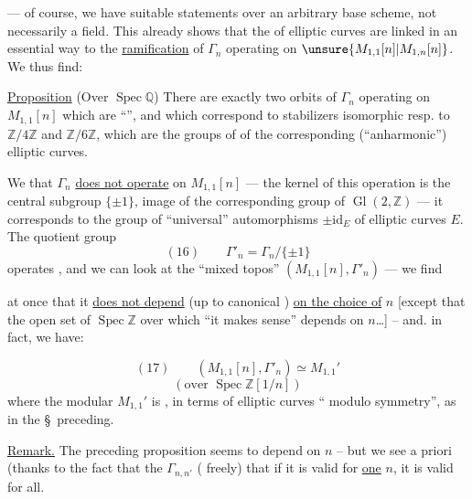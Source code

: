 
--- of course, we have suitable statements over an arbitrary base scheme, not necessarily a field. This already shows that the  of elliptic curves are linked in an essential way to the \uline{ramification} of $\Gamma_n$ operating on $\unsure{M_{1,1}[n]|M_{1,n}[n]}$. We thus find:

\uline{Proposition} (Over $\operatorname{Spec}\mathbb Q$) There are exactly two orbits of $\Gamma_n$ operating on $M_{1,1}[n]$ which are ``'', and which correspond to stabilizers isomorphic resp. to $\mathbb Z/4\mathbb Z$ and $\mathbb Z/6\mathbb Z$, which are the groups of  of the corresponding (``anharmonic'') elliptic curves.


We  that $\Gamma_n$ \uline{does not operate}  on $M_{1,1}[n]$ --- the kernel of this operation is the central subgroup $\{\pm1\}$, image of the corresponding group of $\operatorname{Gl}(2,\mathbb Z)$ --- it corresponds to the group of ``universal'' automorphisms $\pm\mathrm{id}_E$ of elliptic curves $E$. The quotient group
\[
(16)\qquad \Gamma'_n=\Gamma_n/\{\pm1\}
\]
 operates , and we can look at the ``mixed topos'' $(M_{1,1}[n],\Gamma'_n)$ --- we find

at once that it \uline{does not depend} (up to canonical ) \uline{on the choice of} $n$ [except that the open set of $\operatorname{Spec}\mathbb Z$ over which ``it makes sense'' depends on $n$\dots] -- and. in fact, we have:


\[
(17)\qquad (M_{1,1}[n],\Gamma'_n)\simeq M_{1,1}'
\]
\[
(\text{over }\operatorname{Spec}\mathbb Z[1/n])
\]
where the modular   $M_{1,1}'$ is , in terms of elliptic curves `` modulo symmetry'', as in the \S\ preceding.

\uline{Remark.} The preceding proposition seems to depend on $n$ -- but we see a priori  (thanks to the fact that the $\Gamma_{n,n'}$  ( freely) that if it is valid for \uline{one} $n$, it is valid for all.

